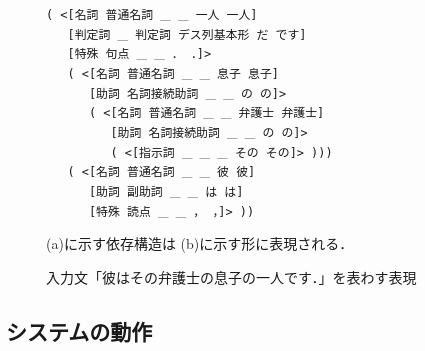 \begin{figure}[t]
\begin{center}
{\begin{minipage}[c]{340pt}
\begin{center}
 \begin{minipage}[c]{260pt}
\baselineskip=12pt
\hspace*{0cm}\protect\verb+( <[名詞 普通名詞 +\_\verb+ +\_\verb+ 一人 一人]+\\
\hspace*{0.33cm}\protect\verb+   [判定詞 +\_\verb+ 判定詞 デス列基本形 だ です]+\\
\hspace*{0.33cm}\protect\verb+   [特殊 句点 +\_\verb+ +\_\verb+ ． ．]> +\\
\hspace*{0.33cm}\protect\verb+   ( <[名詞 普通名詞 +\_\verb+ +\_\verb+ 息子 息子]+\\
\hspace*{0.84cm}\protect\verb+      [助詞 名詞接続助詞 +\_\verb+ +\_\verb+ の の]> +\\
\hspace*{0.84cm}\protect\verb+      ( <[名詞 普通名詞 +\_\verb+ +\_\verb+ 弁護士 弁護士]+\\
\hspace*{1.36cm}\protect\verb+         [助詞 名詞接続助詞 +\_\verb+ +\_\verb+ の の]> +\\
\hspace*{1.36cm}\protect\verb+         ( <[指示詞 +\_\verb+ +\_\verb+ +\_\verb+ その その]> )))+\\
\hspace*{0.33cm}\protect\verb+   ( <[名詞 普通名詞 +\_\verb+ +\_\verb+ 彼 彼]+\\
\hspace*{0.84cm}\protect\verb+      [助詞 副助詞 +\_\verb+ +\_\verb+ は は]+\\
\hspace*{0.84cm}\protect\verb+      [特殊 読点 +\_\verb+ +\_\verb+ ， ，]> ))+
  \end{minipage}
\end{center}

{

\hspace*{2cm}
(a)に示す依存構造は
(b)に示す形に表現される．
}



  \end{minipage} }
  \caption{入力文「彼はその弁護士の息子の一人です．」を表わす表現}
  \label{fig:弁護士_csan}
  \end{center}
\end{figure}
\subsection{システムの動作}\label{sec:system}

